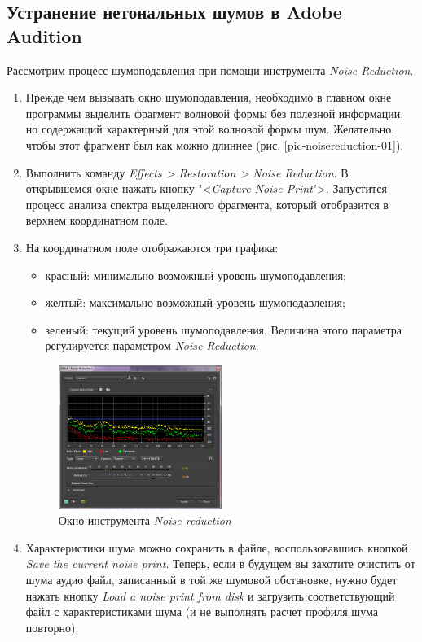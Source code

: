 \documentclass[oneside, final, 14pt]{extreport}
\begin{document}
\subsection{Устранение нетональных шумов в Adobe Audition}
Рассмотрим процесс шумоподавления при помощи инструмента \textit{Noise Reduction}.
\begin{enumerate}
    \item Прежде чем вызывать окно шумоподавления, необходимо в главном окне программы выделить фрагмент волновой формы без полезной информации, но содержащий характерный для этой волновой формы шум. Желательно, чтобы этот фрагмент был как можно длиннее (рис. \ref{pic-noisereduction-01}).
    \item Выполнить команду \textit{Effects > Restoration > Noise Reduction}. В открывшемся окне нажать кнопку "<\emph{Capture Noise Print}">. Запустится процесс анализа спектра выделенного фрагмента, который отобразится в верхнем координатном поле.
    \item На координатном поле отображаются три графика:
        \begin{itemize}
            \item красный: минимально возможный уровень шумоподавления;
            \item желтый: максимально возможный уровень шумоподавления;
            \item зеленый: текущий уровень шумоподавления. Величина этого параметра регулируется параметром \textit{Noise Reduction}.
        \end{itemize}
        \begin{figure}[h]
            \centering
            \includegraphics[width=0.5\textwidth]{pic-noisereduction-02}
            \caption{Окно инструмента \textit{Noise reduction}}
            \label{pic-noisereduction-02}
        \end{figure}
    \item Характеристики шума можно сохранить в файле, воспользовавшись кнопкой \textit{Save the current noise print}. Теперь, если в будущем вы захотите очистить от шума аудио файл, записанный в той же шумовой обстановке, нужно будет нажать кнопку \textit{Load a noise print from disk} и загрузить соответствующий файл с характеристиками шума (и не выполнять расчет профиля шума повторно).

\end{enumerate}
\end{document}
